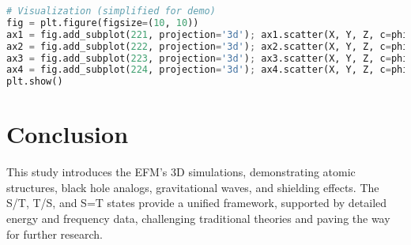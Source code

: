 \documentclass{article}
\begin{document}
\begin{lstlisting}[language=Python, caption=3D Fluxonic Simulations, label=lst:simulation]
# Visualization (simplified for demo)
fig = plt.figure(figsize=(10, 10))
ax1 = fig.add_subplot(221, projection='3d'); ax1.scatter(X, Y, Z, c=phi_atomic, cmap='inferno'); ax1.set_title('Atomic Structures')
ax2 = fig.add_subplot(222, projection='3d'); ax2.scatter(X, Y, Z, c=phi_bh, cmap='inferno'); ax2.set_title('Black Holes')
ax3 = fig.add_subplot(223, projection='3d'); ax3.scatter(X, Y, Z, c=phi_gw, cmap='inferno'); ax3.set_title('Gravitational Waves')
ax4 = fig.add_subplot(224, projection='3d'); ax4.scatter(X, Y, Z, c=phi_shield, cmap='inferno'); ax4.set_title('Shielding')
plt.show()
\end{lstlisting}

\section{Conclusion}
This study introduces the EFM’s 3D simulations, demonstrating atomic structures, black hole analogs, gravitational waves, and shielding effects. The S/T, T/S, and S=T states provide a unified framework, supported by detailed energy and frequency data, challenging traditional theories and paving the way for further research.
\end{document}
